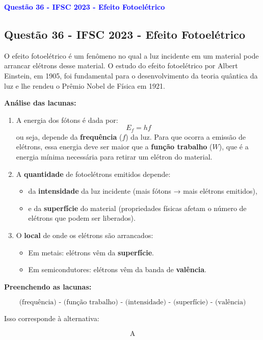 \begin{flushleft}
\textbf{\textcolor{blue}{\Large Quest\~ao 36 - IFSC 2023 - Efeito Fotoelétrico}}\\
\noindent

\subsection{Quest\~ao 36 - IFSC 2023 - Efeito Fotoelétrico}
O efeito fotoelétrico é um fenômeno no qual a luz incidente em um material pode arrancar 
elétrons desse material. O estudo do efeito fotoelétrico por Albert Einstein, em 1905, foi 
fundamental para o desenvolvimento da teoria quântica da luz e lhe rendeu o Prêmio Nobel de Física em 1921.

\textbf{Análise das lacunas:}

\begin{enumerate}
    \item A energia dos fótons é dada por:
    \[
    E_f = h f
    \]
    ou seja, depende da \textbf{frequência} (\(f\)) da luz.  
    Para que ocorra a emissão de elétrons, essa energia deve ser maior que a \textbf{função trabalho} (\(W\)), que é a energia mínima necessária para retirar um elétron do material.

    \item A \textbf{quantidade} de fotoelétrons emitidos depende:
    \begin{itemize}
        \item da \textbf{intensidade} da luz incidente (mais fótons → mais elétrons emitidos),
        \item e da \textbf{superfície} do material (propriedades físicas afetam o número de elétrons que podem ser liberados).
    \end{itemize}

    \item O \textbf{local} de onde os elétrons são arrancados:
    \begin{itemize}
        \item Em metais: elétrons vêm da \textbf{superfície}.
        \item Em semicondutores: elétrons vêm da banda de \textbf{valência}.
    \end{itemize}
\end{enumerate}

\textbf{Preenchendo as lacunas:}

\[
\text{(frequência) - (função trabalho) - (intensidade) - (superfície) - (valência)}
\]

Isso corresponde à alternativa:

\[
\boxed{\text{A}}
\]

\end{flushleft}


